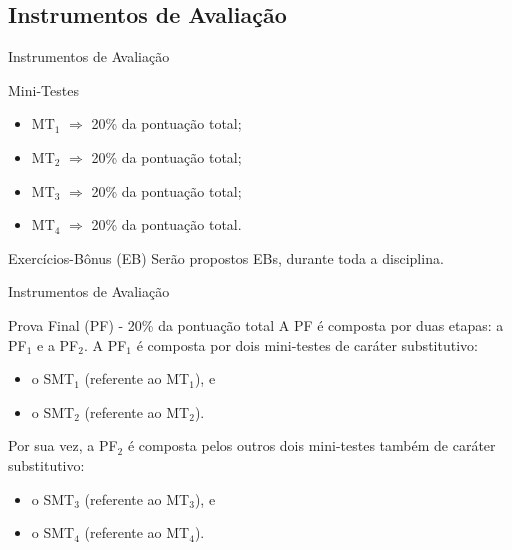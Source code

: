 \documentclass[xcolor=dvipsnames,table]{beamer}
\begin{document}
	\subsection{Instrumentos de Avaliação}
	\begin{frame}{Instrumentos de Avaliação}
		\begin{block}{Mini-Testes}
			\begin{itemize}
				\item MT$_1$ $\Rightarrow$ 20\% da pontuação total;
				\item MT$_2$ $\Rightarrow$ 20\% da pontuação total;
				\item MT$_3$ $\Rightarrow$ 20\% da pontuação total;
				\item MT$_4$ $\Rightarrow$  20\% da pontuação total.
			\end{itemize}
		\end{block} \pause
		\begin{block}{Exercícios-Bônus (EB)}
			Serão propostos EBs, durante toda a disciplina.
		\end{block}
	\end{frame}

	\begin{frame}{Instrumentos de Avaliação}
		\begin{block}{Prova Final (PF) - 20\% da pontuação total}
			A PF é composta por duas etapas: a PF$_1$ e a PF$_2$. 
			A PF$_1$ é composta por dois mini-testes de caráter substitutivo: \pause 
			\begin{itemize}
				\item o SMT$_1$ (referente ao MT$_1$), e 
				\item o SMT$_2$ (referente ao MT$_2$).
			\end{itemize} \pause
			Por sua vez, a PF$_2$ é composta pelos outros dois mini-testes também de caráter substitutivo:  \pause
			\begin{itemize}
				\item o SMT$_3$ (referente ao MT$_3$), e 
				\item o SMT$_4$ (referente ao MT$_4$).
			\end{itemize}
		\end{block}
	\end{frame}
\end{document}
